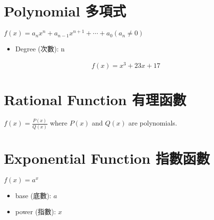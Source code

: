 \section{Polynomial 多項式}
\begin{defn}{}
$f(x) = a_{n}x^{n} + a_{n - 1}x^{n + 1} + \cdots + a_{0} (a_{n} \neq 0)$
\begin{itemize}
\item Degree (次數): n
\end{itemize}
\end{defn}

\begin{eg}{} 
\begin{align*}
f(x) = x^3 + 23x + 17
\end{align*}
\end{eg}

\section{Rational Function  有理函數}
\begin{defn}{}
$f(x) = \frac{P(x)}{Q(x)}$ where $P(x)$ and $Q(x)$ are polynomials.
\end{defn}

\section{Exponential Function 指數函數}
\begin{defn}{}
$f(x) = a^{x}$
\begin{itemize}
\item base (底數): $a$
\item power (指數): $x$
\end{itemize}
\end{defn}